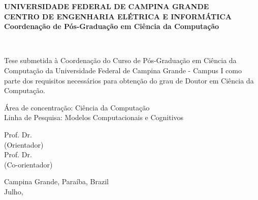 \begin{center}
\textbf{UNIVERSIDADE FEDERAL DE CAMPINA GRANDE} \\
\textbf{CENTRO DE ENGENHARIA ELÉTRICA E INFORMÁTICA} \\
\textbf{Coordenação de Pós-Graduação em Ciência da Computação}
\vspace{3em}

\Large{}
\thetitle
\vspace{3em}

\Large{\theauthor}\\
\vspace{3em}

\normalsize
\begin{flushright}
\parbox[t]{122mm}{Tese submetida à Coordenação do Curso de Pós-Graduação em Ciência da Computação da Universidade Federal de Campina Grande - Campus I como parte dos requisitos necessários para obtenção do grau de Doutor em Ciência da Computação.}
\end{flushright}
\vspace{3em}

\begin{flushleft}
Área de concentração: Ciência da Computação\\
Linha de Pesquisa: Modelos Computacionais e Cognitivos
\vspace{3em}
\end{flushleft}

Prof. Dr. \profa\\
(Orientador) \\
\vspace{1em}
Prof. Dr. \profb\\
(Co-orientador)
\vfill

Campina Grande, Paraíba, Brazil \\
Julho, \the\year %
\end{center}
